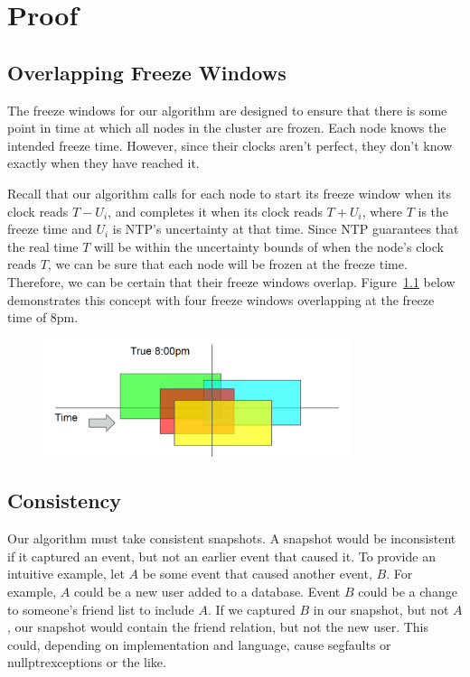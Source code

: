 \chapter{Proof}
\label{sec:proof}

\section{Overlapping Freeze Windows}

The freeze windows for our algorithm are designed to ensure
that there is some point in time at which all nodes in the cluster are
frozen. Each node knows the intended freeze time. However, since their
clocks aren’t perfect, they don’t know exactly when they have reached it.

Recall that our algorithm calls for each node to start its freeze
window when its clock reads $T - U_i$, and completes it when its clock
reads $T + U_i$, where $T$ is the freeze time and $U_i$ is NTP’s uncertainty
at that time. Since NTP guarantees that the real time $T$ will be within
the uncertainty bounds of when the node’s clock reads $T$, we can be
sure that each node will be frozen at the freeze time. Therefore, we
can be certain that their freeze windows overlap. 
Figure~\ref{fig:overlapping-windows} below
demonstrates this concept with four freeze windows overlapping at the freeze 
time of 8pm.

\begin{figure}[h]
  \centering
  \caption{}
  \label{fig:overlapping-windows}
  \includegraphics[width=0.8\textwidth]{overlapping-windows.png}
\end{figure}

\section{Consistency}

Our algorithm must take consistent snapshots. A snapshot would be
inconsistent if it captured an event, but not an earlier event that
caused it. To provide an intuitive example, let $A$ be some event that
caused another event, $B$.  For example, $A$ could be a new user added
to a database. Event $B$ could be a change to someone's friend list to
include $A$. If we captured $B$ in our snapshot, but not $A$, our
snapshot would contain the friend relation, but not the new user. This
could, depending on implementation and language, cause segfaults or
nullptrexceptions or the like.

